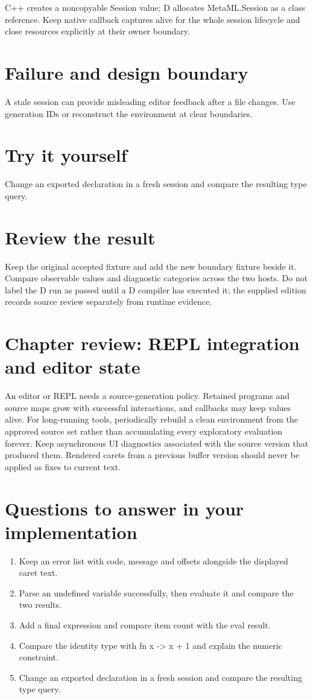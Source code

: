 \clearpage
{}
C++ creates a noncopyable Session value; D allocates MetaML.Session as a class reference. Keep native callback captures alive for the whole session lifecycle and close resources explicitly at their owner boundary.


\section*{Failure and design boundary}
A stale session can provide misleading editor feedback after a file changes. Use generation IDs or reconstruct the environment at clear boundaries.

\section*{Try it yourself}
Change an exported declaration in a fresh session and compare the resulting type query.

\section*{Review the result}
Keep the original accepted fixture and add the new boundary fixture beside it. Compare observable values and diagnostic categories across the two hosts. Do not label the D run as passed until a D compiler has executed it; the supplied edition records source review separately from runtime evidence.

\clearpage
\section*{Chapter review: REPL integration and editor state}
An editor or REPL needs a source-generation policy. Retained programs and source maps grow with successful interactions, and callbacks may keep values alive. For long-running tools, periodically rebuild a clean environment from the approved source set rather than accumulating every exploratory evaluation forever. Keep asynchronous UI diagnostics associated with the source version that produced them. Rendered carets from a previous buffer version should never be applied as fixes to current text.

\section*{Questions to answer in your implementation}
\begin{enumerate}
\item Keep an error list with code, message and offsets alongside the displayed caret text.
\item Parse an undefined variable successfully, then evaluate it and compare the two results.
\item Add a final expression and compare item count with the eval result.
\item Compare the identity type with fn x -> x + 1 and explain the numeric constraint.
\item Change an exported declaration in a fresh session and compare the resulting type query.
\end{enumerate}
